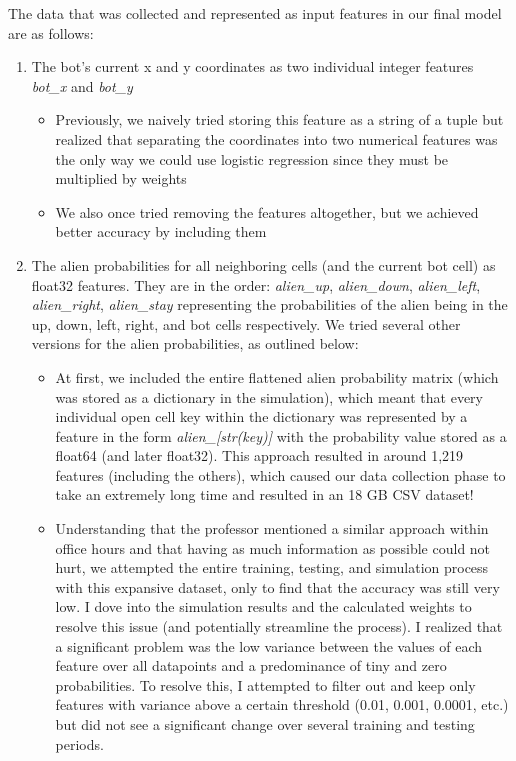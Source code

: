 \documentclass[11pt]{article}
\begin{document}
The data that was collected and represented as input features in our final model are as follows:

\begin{enumerate}
    \item The bot's current x and y coordinates as two individual integer features \emph{bot\_x} and \emph{bot\_y}
    \begin{itemize}
        \item Previously, we naively tried storing this feature as a string of a tuple but realized that separating the coordinates into two numerical features was the only way we could use logistic regression since they must be multiplied by weights
        \item We also once tried removing the features altogether, but we achieved better accuracy by including them
    \end{itemize}
    \item The alien probabilities for all neighboring cells (and the current bot cell) as float32 features. They are in the order: \emph{alien\_up}, \emph{alien\_down}, \emph{alien\_left}, \emph{alien\_right}, \emph{alien\_stay} representing the probabilities of the alien being in the up, down, left, right, and bot cells respectively. We tried several other versions for the alien probabilities, as outlined below:
    \begin{itemize}
        \item At first, we included the entire flattened alien probability matrix (which was stored as a dictionary in the simulation), which meant that every individual open cell key within the dictionary was represented by a feature in the form \emph{alien\_[str(key)]} with the probability value stored as a float64 (and later float32). This approach resulted in around 1,219 features (including the others), which caused our data collection phase to take an extremely long time and resulted in an 18 GB CSV dataset!
        \item Understanding that the professor mentioned a similar approach within office hours and that having as much information as possible could not hurt, we attempted the entire training, testing, and simulation process with this expansive dataset, only to find that the accuracy was still very low. I dove into the simulation results and the calculated weights to resolve this issue (and potentially streamline the process). I realized that a significant problem was the low variance between the values of each feature over all datapoints and a predominance of tiny and zero probabilities. To resolve this, I attempted to filter out and keep only features with variance above a certain threshold (0.01, 0.001, 0.0001, etc.) but did not see a significant change over several training and testing periods.

\end{itemize}
\end{enumerate}
\end{document}
